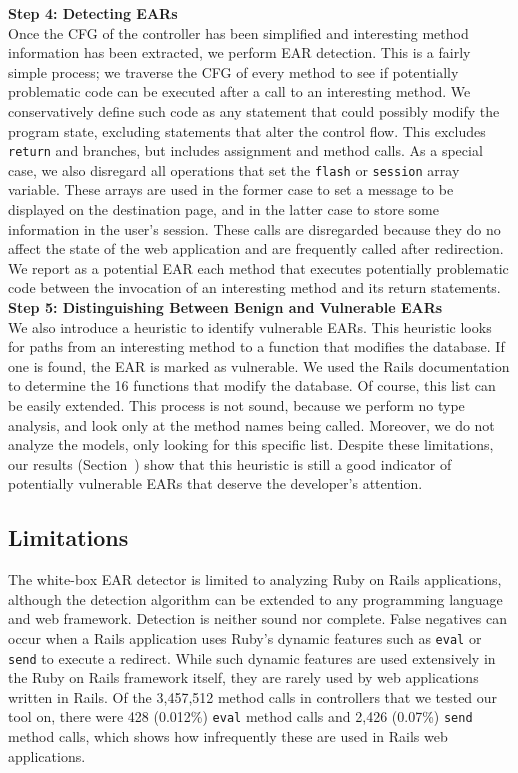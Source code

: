 \noindent\textbf{Step 4: Detecting EARs}\\
Once the CFG of the controller has been simplified and interesting method
information has been extracted, we perform EAR detection. This is a
fairly simple process; we traverse the CFG of every method to see if
potentially problematic code can be executed after a call to an interesting method. We conservatively define such code
as any statement that could possibly modify the program state,
excluding statements that alter the control flow. This excludes
\texttt{return} and branches, but includes assignment and method
calls. As a special case, we also disregard all operations that set
the \texttt{flash} or \texttt{session} array variable. These arrays
are used in the former case to set a message to be displayed on the
destination page, and in the latter case to store some information in
the user's session. These calls are disregarded because they do no
affect the state of the web application and are frequently called
after redirection. We report as a potential EAR each method that
executes potentially problematic code between the invocation of an interesting method and its
return statements. 
\\

\noindent\textbf{Step 5: Distinguishing Between Benign and Vulnerable EARs}\\
We also introduce a heuristic to identify vulnerable EARs. This
heuristic looks for paths from an interesting method to a function that
modifies the database. If one is found, the EAR is marked as
vulnerable. We used the Rails documentation to determine the 16
functions that modify the database. Of course, this list can be easily extended.
This process is not sound, because we perform no type analysis, and
look only at the method names being called. Moreover, we do not
analyze the models, only looking for this specific list. Despite these
limitations, our results (Section~) show that this
heuristic is still a good indicator of potentially vulnerable
EARs that deserve the developer's attention.

\subsection{Limitations}
The white-box EAR detector is limited to analyzing Ruby on Rails
applications, although the detection algorithm can be extended to any
programming language and web framework. Detection is neither sound nor
complete. False negatives can occur when a Rails application uses Ruby's
dynamic features such as \texttt{eval} or \texttt{send} to execute a
redirect. While such dynamic features are used extensively in the Ruby on
Rails framework itself, they are rarely used by web applications written in
Rails. Of the 3,457,512 method calls in controllers that we tested our tool
on, there were 428 (0.012\%) \texttt{eval} method calls and 2,426 (0.07\%)
\texttt{send} method calls, which shows how infrequently these are used in
Rails web applications.

